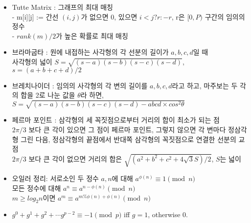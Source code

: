 \documentclass[landscape, 8pt, a4paper, oneside]{extarticle} %
\begin{document}
\begin{multicols*}{3}
\begin{itemize}
\item Tutte Matrix : 그래프의 최대 매칭\\
- m[i][j] := 간선 $(i, j)$가 없으면 0, 있으면 $i < j ? r : -r$, r은 $[0,P)$ 구간의 임의의 정수\\
- $rank(m) / 2$가 높은 확률로 최대 매칭

\item 브라마굽타 : 원에 내접하는 사각형의 각 선분의 길이가 $a, b, c, d$일 때\\
사각형의 넓이 $S=\sqrt{(s-a)(s-b)(s-c)(s-d)}$, $s=(a+b+c+d)/2$

\item 브레치나이더 : 임의의 사각형의 각 변의 길이를 $a,b,c,d$라고 하고, 마주보는 두 각의 합을 2로 나눈 값을 $\theta$라 하면, $S=\sqrt{(s-a)(s-b)(s-c)(s-d)-abcd\times cos^2 \theta}$

\item 페르마 포인트 : 삼각형의 세 꼭짓점으로부터 거리의 합이 최소가 되는 점\\
$2\pi/3$ 보다 큰 각이 있으면 그 점이 페르마 포인트, 그렇지 않으면 각 변마다 정삼각형 그린 다음, 정삼각형의 끝점에서 반대쪽 삼각형의 꼭짓점으로 연결한 선분의 교점\\
$2\pi/3$ 보다 큰 각이 없으면 거리의 합은 $\sqrt{(a^2 + b^2 + c^2 + 4\sqrt 3 S) / 2}$, $S$는 넓이

\item 오일러 정리: 서로소인 두 정수 $a,n$에 대해 $a^{\phi(n)}\equiv 1 \pmod n$\\
모든 정수에 대해 $a^n \equiv a^{n-\phi(n)} \pmod n$\\
$m\geq log_2 n$이면 $a^m\equiv a^{m\%\phi(n)+\phi(n)}\pmod n$

\item $g^0+g^1+g^2+\cdots g^{p-2}\equiv -1 \pmod p$ iff $g=1$, otherwise $0$.

\end{itemize}

{}{}{}{}{}
\begin{itemize}
\setlength\itemsep{0.1em}


\end{itemize}
\end{multicols*}
\end{document}
